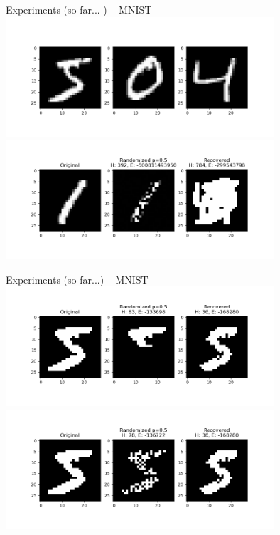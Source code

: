 \documentclass[10pt]{beamer}
\begin{document}
\begin{frame}{Experiments (so far... ) -- MNIST}	
	\centering
	\includegraphics[width=0.75\textwidth]{"../img/digits.png"}\\
	\includegraphics[width=0.75\textwidth]{"../img/digits_result_grayscale.png"}	
\end{frame}

\begin{frame}{Experiments (so far...) -- MNIST}	
	\centering
	\includegraphics[width=0.75\textwidth]{"../img/digits_result_good_covered.png"}\\
	\includegraphics[width=0.75\textwidth]{"../img/digits_result_good_random.png"}
\end{frame}
\end{document}
